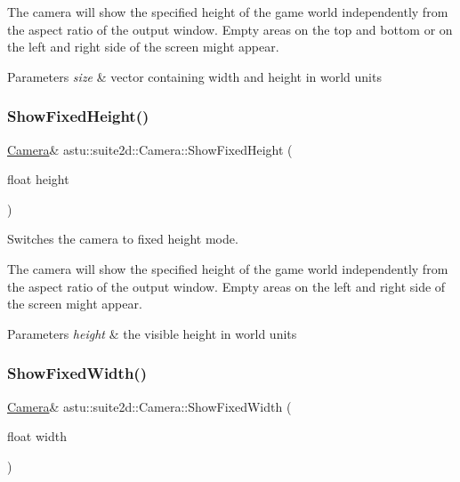 The camera will show the specified height of the game world independently from the aspect ratio of the output window. Empty areas on the top and bottom or on the left and right side of the screen might appear.


\begin{DoxyParams}{Parameters}
{\em size} & vector containing width and height in world units \\
\hline
\end{DoxyParams}
\mbox{\label{classastu_1_1suite2d_1_1Camera_a8e5b6040037566353c110ca8dcabdb47}} 
\subsubsection{\texorpdfstring{Show\+Fixed\+Height()}{ShowFixedHeight()}}
{\footnotesize\ttfamily \hyperlink{classastu_1_1suite2d_1_1Camera}{Camera}\& astu\+::suite2d\+::\+Camera\+::\+Show\+Fixed\+Height (\begin{DoxyParamCaption}\item[{float}]{height }\end{DoxyParamCaption})}

Switches the camera to fixed height mode.

The camera will show the specified height of the game world independently from the aspect ratio of the output window. Empty areas on the left and right side of the screen might appear.


\begin{DoxyParams}{Parameters}
{\em height} & the visible height in world units \\
\hline
\end{DoxyParams}
\mbox{\label{classastu_1_1suite2d_1_1Camera_a54880a7c259cd32f2313a7062118f294}} 
\subsubsection{\texorpdfstring{Show\+Fixed\+Width()}{ShowFixedWidth()}}
{\footnotesize\ttfamily \hyperlink{classastu_1_1suite2d_1_1Camera}{Camera}\& astu\+::suite2d\+::\+Camera\+::\+Show\+Fixed\+Width (\begin{DoxyParamCaption}\item[{float}]{width }\end{DoxyParamCaption})}

